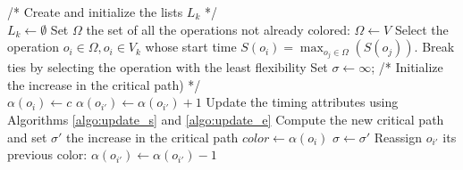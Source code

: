 \begin{algorithm}[!htp]		
	/* Create and initialize the lists $L_k$ */\\
	{
		$L_k \leftarrow \emptyset$\;
	}
	Set $\Omega$ the set of all the operations not already colored: $\Omega \leftarrow V$\;
	\While{$\Omega \neq \emptyset$}
	{
		Select the operation $o_i \in \Omega, o_i \in V_k$ whose start time $S(o_i) = \max_{o_j \in \Omega}(S(o_j))$. Break ties by selecting the operation with the least flexibility\;	
		Set $\sigma \leftarrow \infty$; /* Initialize the increase in the critical path) */\\
		{
			{
				{
					$\alpha(o_i) \leftarrow c$\;
						{
								$\alpha(o_{i'}) \leftarrow \alpha(o_{i'}) + 1$\;
								Update the timing attributes using Algorithms \ref{algo:update_s} and \ref{algo:update_e}\;
						}
						Compute the new critical path and set $\sigma'$ the increase in the critical path\;
							{
								$color \leftarrow \alpha(o_i)$\;
								$\sigma \leftarrow \sigma'$\;
							}
							{
								Reassign $o_{i'}$ its previous color: $\alpha(o_{i'}) \leftarrow \alpha(o_{i'})-1$\;
							}
				}
}}}
\end{algorithm}
